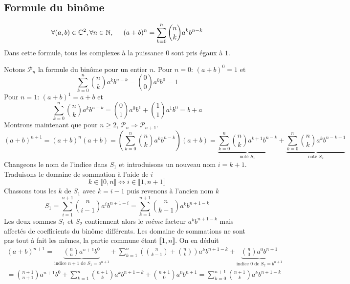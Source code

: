 \subsection{Formule du binôme}
\begin{prop}
\begin{displaymath}
  \forall (a,b)\in \mathbb{C}^2, \forall n\in \mathbb{N},\hspace{0.5cm}
  (a+b)^n = \sum_{k=0}^{n}\binom{n}{k}a^{k}b^{n-k}
\end{displaymath}
Dans cette formule, tous les complexes à la puissance $0$ sont pris égaux à $1$.
\end{prop}

\begin{demo}
Notons $\mathcal{P}_n$ la formule du binôme pour un entier $n$.\newline
Pour $n=0$: $(a+b)^0=1$  et
\begin{displaymath}
  \sum_{k=0}^{n}\binom{n}{k}a^{k}b^{n-k} = \binom{0}{0}a^{0}b^{0}=1
\end{displaymath}
Pour $n = 1$: $(a+b)^1 = a+b$ et 
\begin{displaymath}
  \sum_{k=0}^{n}\binom{n}{k}a^{k}b^{n-k} = \binom{0}{1}a^{0}b^{1} + \binom{1}{1}a^{1}b^{0}= b + a
\end{displaymath}
Montrons maintenant que pour $n\geq 2$, $\mathcal{P}_n \Rightarrow \mathcal{P}_{n+1}$.
\begin{displaymath}
  (a+b)^{n+1} = (a+b)^n (a+b)
  = \left( \sum_{k=0}^{n}\binom{n}{k}a^{k}b^{n-k}\right) (a+b)
  = \underset{\text{noté }S_1}{\underbrace{\sum_{k=0}^{n}\binom{n}{k}a^{k+1}b^{n-k}}}
  + \underset{\text{noté } S_2}{\underbrace{\sum_{k=0}^{n}\binom{n}{k}a^{k}b^{n-k+1}}}
\end{displaymath}
Changeons le nom de l'indice dans $S_1$ et introduisons un nouveau nom $i = k+1$. Traduisons le domaine de sommation à l'aide de $i$
\begin{displaymath}
  k \in \llbracket 0,n\rrbracket \Leftrightarrow i \in \llbracket 1 , n+1\rrbracket
\end{displaymath}
Chassons tous les $k$ de $S_1$ avec $k= i-1$ puis revenons à l'ancien nom $k$
\begin{displaymath}
  S_1 = \sum_{i=1}^{n+1}\binom{n}{i-1}a^{i}b^{n+1-i} = \sum_{k=1}^{n+1}\binom{n}{k-1}a^{k}b^{n+1-k}
\end{displaymath}
Les deux sommes $S_1$ et $S_2$ contiennent alors le \emph{même} facteur $a^{k}b^{n+1-k}$ mais affectés de coefficients du binôme différents. Les domaine de sommations ne sont pas tout à fait les mêmes, la partie commune étant $\llbracket 1 , n\rrbracket$. On en déduit
\begin{multline*}
(a+b)^{n+1} = \underset{\text{indice $n+1$ de $S_1$} = a^{n+1}}{\underbrace{\binom{n}{n}a^{n+1}b^{0}}} 
 + \sum_{k=1}^{n}\left( \binom{n}{k-1} + \binom{n}{k}\right) a^{k}b^{n+1-k}
 + \underset{\text{indice $0$ de $S_2$} = b^{n+1}}{\underbrace{\binom{n}{0}a^{0}b^{n+1}}} \\
 = \binom{n+1}{n+1} a^{n+1}b^{0}
 + \sum_{k=1}^{n}\binom{n+1}{k} a^{k}b^{n+1-k} + \binom{n+1}{0} a^{0}b^{n+1}
 = \sum_{k=0}^{n+1}\binom{n+1}{k} a^{k}b^{n+1-k}
\end{multline*}


\end{demo}
